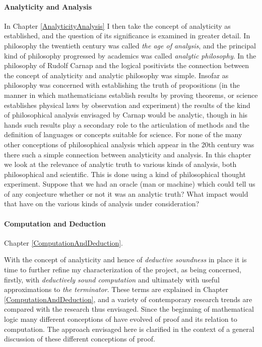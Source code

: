 \paragraph{Analyticity and Analysis}

In Chapter \ref{AnalyticityAnalysis} I then take the concept of
analyticity as established, and the question of its significance is
examined in greater detail. 
In philosophy the twentieth century was called {\it the age of
  analysis}, and the principal kind of philosophy progressed by
academics was called {\it analytic philosophy}. 
In the philosophy of Rudolf Carnap and the logical positivists the
connection between the concept of analyticity and analytic philosophy
was simple. 
Insofar as philosophy was concerned with establishing the truth of
propositions (in the manner in which mathematicians establish results
by proving theorems, or science establishes physical laws by
observation and experiment) the results of the kind of philosophical
analysis envisaged by Carnap would be analytic, though in his hands
such results play a secondary role to the articulation of methods and
the definition of languages or concepts suitable for science. 
For none of the many other conceptions of philosophical analysis which
appear in the 20th century was there such a simple connection
between analyticity and analysis. 
In this chapter we look at the relevance of analytic truth to various
kinds of analysis, both philosophical and scientific. 
This is done using a kind of philosophical thought experiment.
Suppose that we had an oracle (man or machine) which could tell us of
any conjecture whether or not it was an analytic truth? 
What impact would that have on the various kinds of analysis under
consideration?

\paragraph{Computation and Deduction}

Chapter \ref{ComputationAndDeduction}.

With the concept of analyticity and hence of {\it deductive
  soundness} in place it is time to further refine my characterization
of the project, as being concerned, firstly, with {\it deductively
  sound computation} and ultimately with useful approximations to
{\it the terminator}. 
These terms are explained in Chapter
\ref{ComputationAndDeduction}, and a variety of
contemporary research trends are compared with the research thus envisaged.
Since the beginning of mathematical logic many different conceptions of
have evolved of proof and its relation to computation.
The approach envisaged here is clarified in the context of a general
discussion of these different conceptions of proof.

